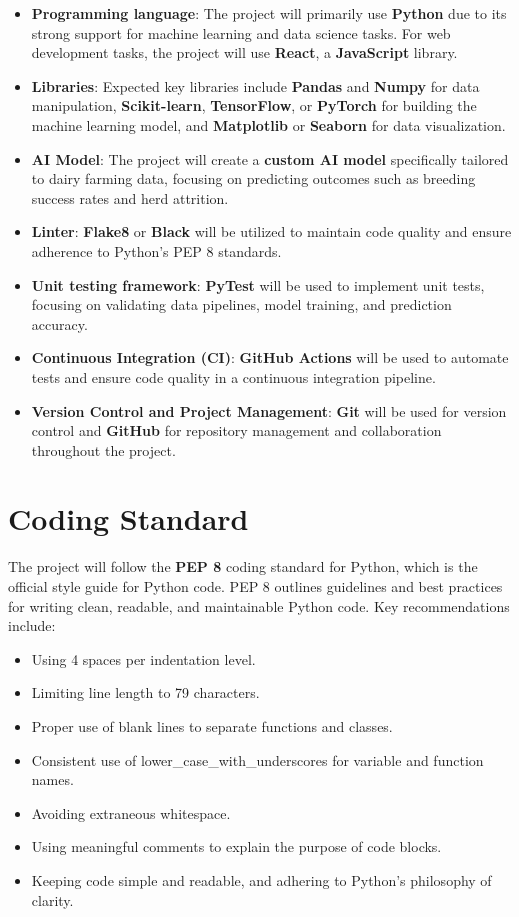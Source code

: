 \documentclass{article}
\begin{document}
\begin{itemize}
    \item \textbf{Programming language}: 
    The project will primarily use \textbf{Python} due to its strong support for machine learning and data science tasks. For web development tasks, the project will use \textbf{React}, a \textbf{JavaScript} library. 
    \item \textbf{Libraries}: 
    Expected key libraries include \textbf{Pandas} and \textbf{Numpy} for data manipulation, \textbf{Scikit-learn}, \textbf{TensorFlow}, or \textbf{PyTorch} for building the machine learning model, and \textbf{Matplotlib} or \textbf{Seaborn} for data visualization.
    \item \textbf{AI Model}: 
    The project will create a \textbf{custom AI model} specifically tailored to dairy farming data, focusing on predicting outcomes such as breeding success rates and herd attrition.
    \item \textbf{Linter}: 
    \textbf{Flake8} or \textbf{Black} will be utilized to maintain code quality and ensure adherence to Python's PEP 8 standards.
    \item \textbf{Unit testing framework}: 
    \textbf{PyTest} will be used to implement unit tests, focusing on validating data pipelines, model training, and prediction accuracy.
    \item \textbf{Continuous Integration (CI)}: 
    \textbf{GitHub Actions} will be used to automate tests and ensure code quality in a continuous integration pipeline.
    \item \textbf{Version Control and Project Management}: 
    \textbf{Git} will be used for version control and \textbf{GitHub} for repository management and collaboration throughout the project.
\end{itemize}

\section{Coding Standard}

The project will follow the \textbf{PEP 8} coding standard for Python, which is the official style guide for Python code. PEP 8 outlines guidelines and best practices for writing clean, readable, and maintainable Python code. Key recommendations include:

\begin{itemize}
    \item Using 4 spaces per indentation level.
    \item Limiting line length to 79 characters.
    \item Proper use of blank lines to separate functions and classes.
    \item Consistent use of lower\_case\_with\_underscores for variable and function names.
    \item Avoiding extraneous whitespace.
    \item Using meaningful comments to explain the purpose of code blocks.
    \item Keeping code simple and readable, and adhering to Python’s philosophy of clarity.
    
\end{itemize}
\end{document}
